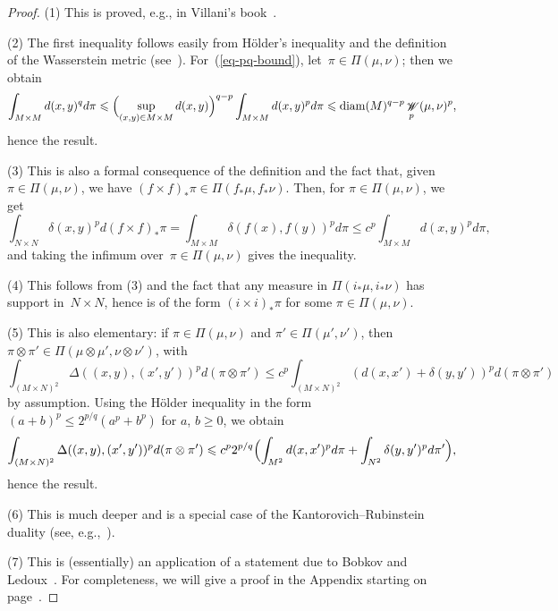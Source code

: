 \documentclass[12pt]{amsart}
\renewcommand{\mathcal}{\mathscr}
\renewcommand{\leq}{\leqslant}
\renewcommand{\geq}{\geqslant}
\DeclareMathOperator{\diam}{diam}
\DeclareMathOperator{\wass}{\mathcal{W}}
\theoremstyle{plain}
\theoremstyle{remark}
\theoremstyle{definition}
\renewcommand{\geq}{\geqslant}
\renewcommand{\leq}{\leqslant}
\begin{document}
\begin{proof}
  (1) This is proved, e.g., in Villani's
  book~\cite[Th.\,7.3,\,Th.\,7.12]{villani}.
  
  (2) The first inequality follows easily from H\"older's inequality and
  the definition of the Wasserstein metric
  (see~\cite[7.1.2]{villani}). For~(\ref{eq-pq-bound}),
  let~$\pi\in\Pi(\mu,\nu)$; then we obtain
  \[
    \int_{M\times M}d(x,y)^qd\pi\leq \Bigl(\sup_{(x,y)\in M\times
      M}d(x,y)\Bigr)^{q-p} \int_{M\times M}d(x,y)^pd\pi
    \leq\diam(M)^{q-p}\wass_p(\mu,\nu)^p,
  \]
  hence the result.

  (3) This is also a formal consequence of the definition and the fact
  that, given $\pi\in \Pi(\mu,\nu)$, we have
  $(f \times f)_*\pi\in \Pi(f_*\mu,f_*\nu)$. Then, for
  $\pi\in \Pi(\mu,\nu)$, we get
  \[
    \int_{N\times N}\delta(x,y)^pd(f\times f)_*\pi=\int_{M \times M}
    \delta(f(x),f(y))^pd\pi \leq c^p\int_{M \times M}d(x,y)^pd\pi,
  \]
  and taking the infimum over~$\pi\in \Pi(\mu,\nu)$ gives the
  inequality.

  (4) This follows from (3) and the fact that any measure in
  $\Pi(i_*\mu,i_*\nu)$ has support in~$N\times N$, hence is of the form
  $(i\times i)_*\pi$ for some $\pi\in \Pi(\mu,\nu)$.

  (5) This is also elementary: if $\pi\in\Pi(\mu,\nu)$ and
  $\pi'\in \Pi(\mu',\nu')$, then
  $\pi\otimes \pi'\in \Pi(\mu\otimes\mu',\nu\otimes\nu')$, with
  \[
    \int_{(M\times N)^2}\Delta((x,y),(x',y'))^pd(\pi\otimes\pi') \leq
    c^p\int_{(M\times N)^2}(d(x,x')+\delta(y,y'))^pd(\pi\otimes\pi')
  \]
  by assumption. Using the H\"older inequality in the form
  $(a+b)^p\leq 2^{p/q}(a^p+b^p)$ for $a$, $b\geq 0$, we obtain
  \[
    \int_{(M\times N)^2}\Delta((x,y),(x',y'))^pd(\pi\otimes\pi')\leq
    c^p2^{p/q}\Bigl( \int_{M^2} d(x,x')^pd\pi +
    \int_{N^2}\delta(y,y')^pd\pi'\Bigr),
  \]
  hence the result.

  (6) This is much deeper and is a special case of the
  Kantorovich--Rubinstein duality (see,
  e.g.,~\cite[Th.\,1.14]{villani}).

  (7) This is (essentially) an application of a statement due to
  Bobkov and Ledoux~\cite{bl_gaussian}. For completeness, we will give
  a proof in the Appendix starting on page~\pageref{sec: appendix proof}.
\end{proof}
\end{document}
